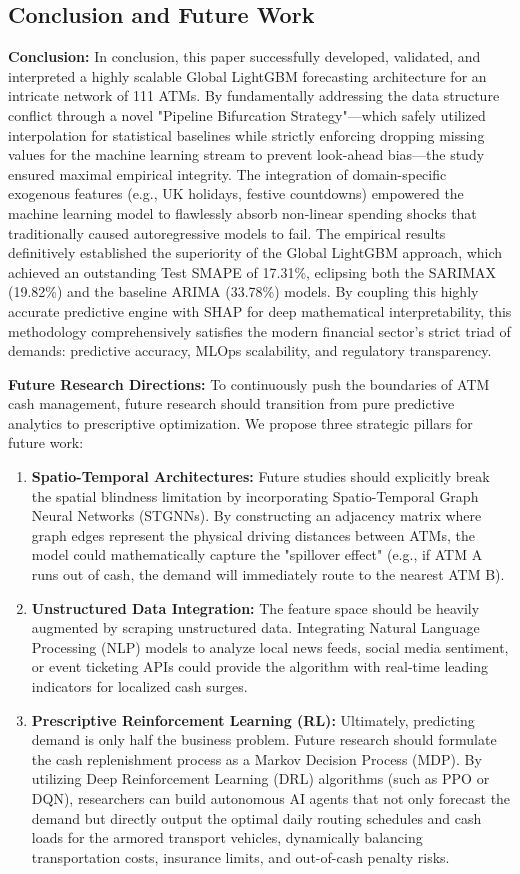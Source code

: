 \documentclass[conference, 12pt, onecolumn]{IEEEtran}
\begin{document}
\subsection{Conclusion and Future Work}
\textbf{Conclusion:} 
In conclusion, this paper successfully developed, validated, and interpreted a highly scalable Global LightGBM forecasting architecture for an intricate network of 111 ATMs. By fundamentally addressing the data structure conflict through a novel "Pipeline Bifurcation Strategy"—which safely utilized interpolation for statistical baselines while strictly enforcing dropping missing values for the machine learning stream to prevent look-ahead bias—the study ensured maximal empirical integrity. The integration of domain-specific exogenous features (e.g., UK holidays, festive countdowns) empowered the machine learning model to flawlessly absorb non-linear spending shocks that traditionally caused autoregressive models to fail. The empirical results definitively established the superiority of the Global LightGBM approach, which achieved an outstanding Test SMAPE of 17.31\%, eclipsing both the SARIMAX (19.82\%) and the baseline ARIMA (33.78\%) models. By coupling this highly accurate predictive engine with SHAP for deep mathematical interpretability, this methodology comprehensively satisfies the modern financial sector's strict triad of demands: predictive accuracy, MLOps scalability, and regulatory transparency.

\textbf{Future Research Directions:} 
To continuously push the boundaries of ATM cash management, future research should transition from pure predictive analytics to prescriptive optimization. We propose three strategic pillars for future work:
\begin{enumerate}
    \item \textbf{Spatio-Temporal Architectures:} Future studies should explicitly break the spatial blindness limitation by incorporating Spatio-Temporal Graph Neural Networks (STGNNs). By constructing an adjacency matrix where graph edges represent the physical driving distances between ATMs, the model could mathematically capture the "spillover effect" (e.g., if ATM A runs out of cash, the demand will immediately route to the nearest ATM B).
    \item \textbf{Unstructured Data Integration:} The feature space should be heavily augmented by scraping unstructured data. Integrating Natural Language Processing (NLP) models to analyze local news feeds, social media sentiment, or event ticketing APIs could provide the algorithm with real-time leading indicators for localized cash surges.
    \item \textbf{Prescriptive Reinforcement Learning (RL):} Ultimately, predicting demand is only half the business problem. Future research should formulate the cash replenishment process as a Markov Decision Process (MDP). By utilizing Deep Reinforcement Learning (DRL) algorithms (such as PPO or DQN), researchers can build autonomous AI agents that not only forecast the demand but directly output the optimal daily routing schedules and cash loads for the armored transport vehicles, dynamically balancing transportation costs, insurance limits, and out-of-cash penalty risks.
\end{enumerate}
\end{document}
